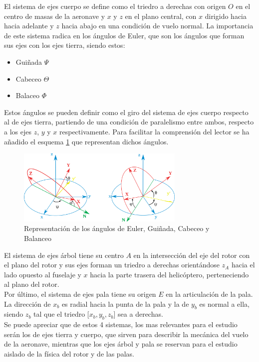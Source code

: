 El sistema de ejes cuerpo se define como el triedro a derechas con origen $O$ en el centro de masas de la aeronave y $x$ y $z$ en el plano central, con $x$ dirigido hacia hacia adelante y $z$ hacia abajo en una condición de vuelo normal. La importancia de este sistema radica en los ángulos de Euler, que son los ángulos que forman sus ejes con los ejes tierra, siendo estos:

\begin{itemize}
	\item Guiñada $\Psi$
	\item Cabeceo $\Theta$
	\item Balaceo $\Phi$
\end{itemize}

Estos ángulos se pueden definir como el giro del sistema de ejes cuerpo respecto al de ejes tierra, partiendo de una condición de paralelismo entre ambos, respecto a los ejes $z$, $y$ y $x$ respectivamente. Para facilitar la comprensión del lector se ha añadido el esquema \ref{AEuler} que representan dichos ángulos.\\

\begin{figure}
	\centering
	\includegraphics[width=80mm]{imagenes/AEuler}
	\caption{Representación de los ángulos de Euler, Guiñada, Cabeceo y Balanceo}
	\label{AEuler}
\end{figure}

El sistema de ejes árbol tiene su centro $A$ en la intersección del eje del rotor con el plano del rotor y sus ejes forman un triedro a derechas orientándose $z_{A}$ hacia el lado opuesto al fuselaje y $x$ hacia la parte trasera del helicóptero, perteneciendo al plano del rotor.\\

Por último, el sistema de ejes pala tiene su origen $E$ en la articulación de la pala. La dirección de $x_{b}$ es radial hacia la punta de la pala y la de $y_{b}$ es normal a ella, siendo $z_{b}$ tal que el triedro [$x_{b},y_{b},z_{b}$] sea a derechas.\\

Se puede apreciar que de estos 4 sistemas, los mas relevantes para el estudio serán los de ejes tierra y cuerpo, que sirven para describir la mecánica del vuelo de la aeronave, mientras que los ejes árbol y pala se reservan para el estudio aislado de la física del rotor y de las palas.\\

